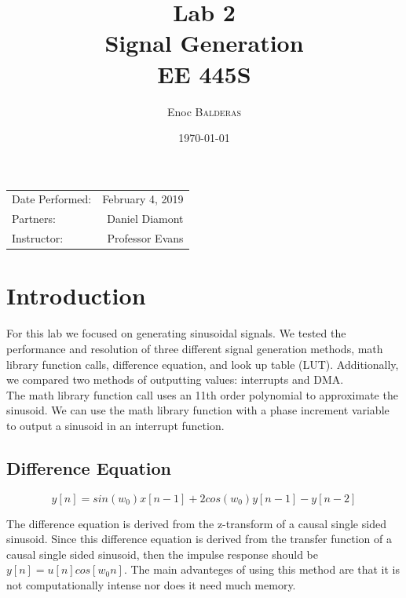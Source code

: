 \documentclass{article}
\title{Lab 2\\ Signal Generation\\ EE 445S} %
\author{Enoc \textsc{Balderas}} %
\date{\today} %
\begin{document}
\maketitle %

\begin{center}
\begin{tabular}{l r}
Date Performed: & February 4, 2019 \\ %
Partners: & Daniel Diamont \\ %
Instructor: & Professor Evans %
\end{tabular}
\end{center}



\section{Introduction}

For this lab we focused on generating sinusoidal signals. 
We tested the performance and resolution of three different signal generation methods, math library function calls, difference equation, and look up table (LUT).
Additionally, we compared two methods of outputting values: interrupts and DMA.\\

The math library function call uses an 11th order polynomial to approximate the sinusoid.
We can use the math library function with a phase increment variable to output a sinusoid in an interrupt function.

\subsection{Difference Equation}

\begin{equation}
y[n] = sin(w_0)x[n-1] + 2cos(w_0)y[n-1] - y[n-2]
\end{equation}

The difference equation is derived from the z-transform of a causal single sided sinusoid.
Since this difference equation is derived from the transfer function of a causal single sided sinusoid, then the impulse response should be $y[n] = u[n]cos[w_0n]$.
The main advanteges of using this method are that it is not computationally intense nor does it need much memory.
\end{document}
